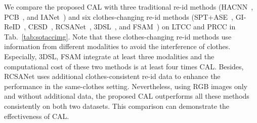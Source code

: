 \documentclass[10pt,twocolumn,letterpaper]{article}
\begin{document}
\begin{table*}[t]
	\centering
	\caption{The ablation studies of CAL on CCVID, LTCC, and PRCC.}
	\vspace{-20pt}
	\small
	\begin{center}
	\end{center}
	\vspace{-20pt}
	\label{tab:calloss}
\end{table*}

We compare the proposed CAL with three traditional re-id methods (\ie HACNN~\cite{Li2018HACNN}, PCB~\cite{Sun2018Beyond}, and IANet~\cite{Hou2019Interaction}) and six clothes-changing re-id methods (\ie SPT+ASE~\cite{Yang2019PRCC}, GI-ReID~\cite{Jin2021Cloth}, CESD~\cite{Qian2020LTCC}, RCSANet~\cite{Huang2021Clothing}, 3DSL~\cite{Chen2021Learning3D}, and FSAM~\cite{Hong2021Finegrained}) on LTCC and PRCC in Tab.~\ref{tab:sotaccimg}.
Note that these clothes-changing re-id methods use information from different modalities to avoid the interference of clothes.
Especially, 3DSL, FSAM integrate at least three modalities and the computational cost of these two methods is at least four times \wrt CAL. 
Besides, RCSANet uses additional clothes-consistent re-id data to enhance the performance in the same-clothes setting.
Nevertheless, using RGB images only and without additional data, the proposed CAL outperforms all these methods consistently on both two datasets.
This comparison can demonstrate the effectiveness of CAL.
\end{document}
